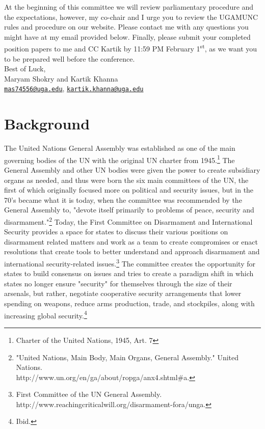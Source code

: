 \documentclass[10pt, letterpaper]{article}
\begin{document}
At the beginning of this committee we will review parliamentary
procedure and the expectations, however, my co-chair and I urge you to
review the UGAMUNC rules and procedure on our website. Please contact me
with any questions you might have at my email provided below. Finally,
please submit your completed position papers to me and CC Kartik by
11:59 PM February 1\textsuperscript{st}, as we want you to be prepared
well before the conference. \\

Best of Luck,\\
Maryam Shokry and Kartik Khanna
\\\href{mailto:mas74556@uga.edu}{\nolinkurl{mas74556@uga.edu}},
\href{mailto:kartik.khanna@uga.edu}{\texttt{kartik.khanna@uga.edu}}

\newpage
\tableofcontents
\newpage
\section{Background}

The United Nations General Assembly was established as one of the main
governing bodies of the UN with the original UN charter from
1945.\footnote{Charter of the United Nations, 1945, Art. 7} The General
Assembly and other UN bodies were given the power to create subsidiary
organs as needed, and thus were born the six main committees of the UN,
the first of which originally focused more on political and security
issues, but in the 70's became what it is today, when the committee was
recommended by the General Assembly to, "devote itself primarily to
problems of peace, security and disarmament."\footnote{"United Nations,
  Main Body, Main Organs, General Assembly." United Nations. \\

  http://www.un.org/en/ga/about/ropga/anx4.shtml\#a.} Today, the First
Committee on Disarmament and International Security provides a space for
states to discuss their various positions on disarmament related matters
and work as a team to create compromises or enact resolutions that
create tools to better understand and approach disarmament and
international security-related issues.\footnote{First Committee of the
  UN General Assembly.
  http://www.reachingcriticalwill.org/disarmament-fora/unga.} The
committee creates the opportunity for states to build consensus on
issues and tries to create a paradigm shift in which states no longer
ensure "security" for themselves through the size of their arsenals, but
rather, negotiate cooperative security arrangements that lower spending
on weapons, reduce arms production, trade, and stockpiles, along with
increasing global security.\footnote{Ibid.} \\
\end{document}

